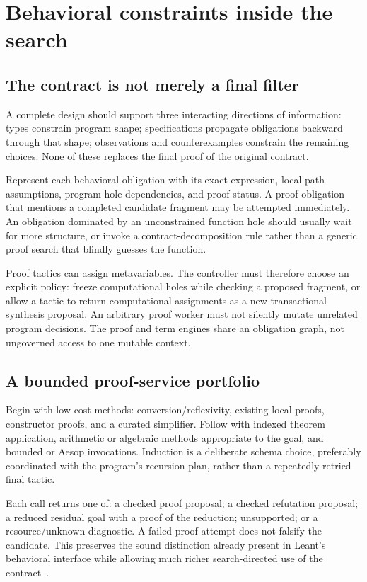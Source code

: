 \section{Behavioral constraints inside the search}\label{sec:behavior}

\subsection{The contract is not merely a final filter}

A complete design should support three interacting directions of information:
types constrain program shape; specifications propagate obligations backward
through that shape; observations and counterexamples constrain the remaining
choices. None of these replaces the final proof of the original contract.

Represent each behavioral obligation with its exact expression, local path
assumptions, program-hole dependencies, and proof status. A proof obligation
that mentions a completed candidate fragment may be attempted immediately. An
obligation dominated by an unconstrained function hole should usually wait for
more structure, or invoke a contract-decomposition rule rather than a generic
proof search that blindly guesses the function.

Proof tactics can assign metavariables. The controller must therefore choose
an explicit policy: freeze computational holes while checking a proposed
fragment, or allow a tactic to return computational assignments as a new
transactional synthesis proposal. An arbitrary proof worker must not silently
mutate unrelated program decisions. The proof and term engines share an
obligation graph, not ungoverned access to one mutable context.

\subsection{A bounded proof-service portfolio}

Begin with low-cost methods: conversion/reflexivity, existing local proofs,
constructor proofs, and a curated simplifier. Follow with indexed theorem
application, arithmetic or algebraic methods appropriate to the goal, and
bounded  or Aesop invocations. Induction is a deliberate schema
choice, preferably coordinated with the program's recursion plan, rather than
a repeatedly retried final tactic.

Each call returns one of: a checked proof proposal; a checked refutation
proposal; a reduced residual goal with a proof of the reduction; unsupported;
or a resource/unknown diagnostic. A failed proof attempt does not falsify the
candidate. This preserves the sound distinction already present in Leant's
behavioral interface while allowing much richer search-directed use of the
contract~\cite{leant-behavior}.

